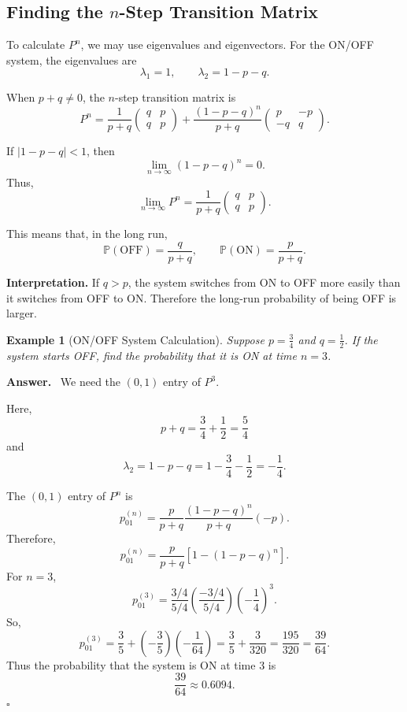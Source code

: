 \documentclass[12pt,a4paper]{article}
\theoremstyle{lecturestyle}
\newtheorem{example}{Example}
\newenvironment{answer}
{\par\textbf{Answer.}\ }
{\hfill$\square$\par}
\newcommand{\Prob}{\mathbb{P}}
\begin{document}
\subsection{Finding the $n$-Step Transition Matrix}

To calculate $P^n$, we may use eigenvalues and eigenvectors. For the ON/OFF system, the eigenvalues are
\[
\lambda_1=1,
\qquad
\lambda_2=1-p-q.
\]

When $p+q\neq 0$, the $n$-step transition matrix is
\[
P^n
=
\frac{1}{p+q}
\begin{pmatrix}
q & p\\
q & p
\end{pmatrix}
+
\frac{(1-p-q)^n}{p+q}
\begin{pmatrix}
p & -p\\
-q & q
\end{pmatrix}.
\]

If $|1-p-q|<1$, then
\[
\lim_{n\to\infty}(1-p-q)^n=0.
\]
Thus,
\[
\lim_{n\to\infty}P^n
=
\frac{1}{p+q}
\begin{pmatrix}
q & p\\
q & p
\end{pmatrix}.
\]

This means that, in the long run,
\[
\Prob(\text{OFF})=\frac{q}{p+q},
\qquad
\Prob(\text{ON})=\frac{p}{p+q}.
\]

\textbf{Interpretation.} If $q>p$, the system switches from ON to OFF more easily than it switches from OFF to ON. Therefore the long-run probability of being OFF is larger.

\begin{example}[ON/OFF System Calculation]
Suppose $p=\frac34$ and $q=\frac12$. If the system starts OFF, find the probability that it is ON at time $n=3$.
\end{example}

\begin{answer}
We need the $(0,1)$ entry of $P^3$.

Here,
\[
p+q=\frac34+\frac12=\frac54
\]
and
\[
\lambda_2=1-p-q
=1-\frac34-\frac12
=-\frac14.
\]

The $(0,1)$ entry of $P^n$ is
\[
p_{01}^{(n)}
=
\frac{p}{p+q}
 \frac{(1-p-q)^n}{p+q}(-p).
\]
Therefore,
\[
p_{01}^{(n)}
=
\frac{p}{p+q}\left[1-(1-p-q)^n\right].
\]
For $n=3$,
\[
p_{01}^{(3)}
=
\frac{3/4}{5/4}
\left(\frac{-3/4}{5/4}\right)\left(-\frac14\right)^3.
\]
So,
\[
p_{01}^{(3)}
=
\frac35+\left(-\frac35\right)\left(-\frac{1}{64}\right)
=
\frac35+\frac{3}{320}
=
\frac{195}{320}
=
\frac{39}{64}.
\]
Thus the probability that the system is ON at time 3 is
\[
\boxed{\frac{39}{64}\approx 0.6094.}
\]
\end{answer}
\end{document}
